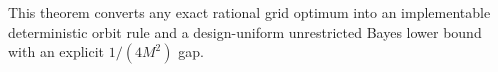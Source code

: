 This theorem converts any exact rational grid optimum into an implementable deterministic orbit rule and a design-uniform unrestricted Bayes lower bound with an explicit \(1/(4M^2)\) gap.